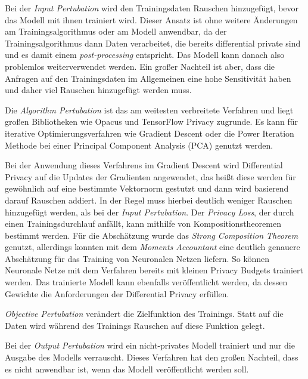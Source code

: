 Bei der \textit{Input Pertubation} wird den Trainingsdaten Rauschen hinzugefügt, bevor das Modell mit ihnen trainiert wird. Dieser Ansatz ist ohne weitere Änderungen am Trainingsalgorithmus oder am Modell anwendbar, da der Trainingsalgorithmus dann Daten verarbeitet, die bereits differential private sind und es damit einem \textit{post-processing} entspricht. Das Modell kann danach also problemlos weiterverwendet werden. Ein großer Nachteil ist aber, dass die Anfragen auf den Trainingsdaten im Allgemeinen eine hohe Sensitivität haben und daher viel Rauschen hinzugefügt werden muss.

Die \textit{Algorithm Pertubation} ist das am weitesten verbreitete Verfahren und liegt großen Bibliotheken wie Opacus\cite{yousefpour:2021} und TensorFlow Privacy\cite{tfprivacy} zugrunde. Es kann für iterative Optimierungsverfahren wie Gradient Descent oder die Power Iteration Methode bei einer Principal Component Analysis (PCA) genutzt werden. 

Bei der Anwendung dieses Verfahrens im Gradient Descent wird Differential Privacy auf die Updates der Gradienten angewendet, das heißt diese werden für gewöhnlich auf eine bestimmte Vektornorm gestutzt und dann wird basierend darauf Rauschen addiert. In der Regel muss hierbei deutlich weniger Rauschen hinzugefügt werden, als bei der \textit{Input Pertubation}.\cite{chang:2023} Der \textit{Privacy Loss}, der durch einen Trainingsdurchlauf anfällt, kann mithilfe von Kompositionstheoremen bestimmt werden. Für die Abschätzung wurde das \textit{Strong Composition Theorem}\cite{dwork:2010} genutzt, allerdings konnten \textcite{abadi:2016} mit dem \textit{Moments Accountant} eine deutlich genauere Abschätzung für das Training von Neuronalen Netzen liefern. So können Neuronale Netze mit dem Verfahren bereits mit kleinen Privacy Budgets trainiert werden. Das trainierte Modell kann ebenfalls veröffentlicht werden, da dessen Gewichte die Anforderungen der Differential Privacy erfüllen.

\textit{Objective Pertubation} verändert die Zielfunktion des Trainings. Statt auf die Daten wird während des Trainings Rauschen auf diese Funktion gelegt.

Bei der \textit{Output Pertubation} wird ein nicht-privates Modell trainiert und nur die Ausgabe des Modells verrauscht. Dieses Verfahren hat den großen Nachteil, dass es nicht anwendbar ist, wenn das Modell veröffentlicht werden soll.

